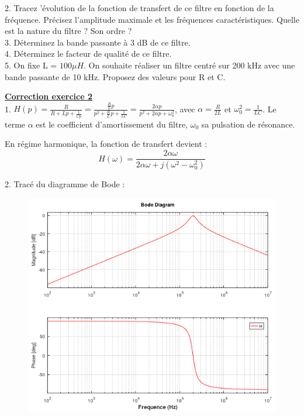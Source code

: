 \documentclass[11pt]{report}
\begin{document}
	2. Tracez 'évolution de la fonction de transfert de ce filtre en fonction de la fréquence. Précisez l'amplitude maximale et les fréquences caractéristiques. Quelle est la nature du filtre ? Son ordre ?\\
	
	3. Déterminez la bande passante à 3 dB de ce filtre. \\
	
	4. Déterminez le facteur de qualité de ce filtre. \\
	
	5. On fixe L = $100 \mu H$. On souhaite réaliser un filtre centré sur 200 kHz avec une bande passante de 10 kHz. Proposez des valeurs pour R et C.
	
	\vspace{1\baselineskip}
	
	\textbf{\underline{Correction exercice 2}}\\
	
	1. $H(p)=\frac{R}{R+Lp+\frac{1}{Cp}}=\frac{\frac{R}{L}p}{p^{2}+\frac{R}{L}p+\frac{1}{LC}} = \frac{2\alpha p}{p^{2}+2\alpha p+\omega_{0}^{2}}$, avec $\alpha=\frac{R}{2L}$ et $\omega_{0}^{2}=\frac{1}{LC}$. Le terme $\alpha$ est le coefficient d'amortissement du filtre, $\omega_{0}$ sa pulsation de résonance.
	
	En régime harmonique, la fonction de transfert devient :
	\begin{equation*}
	H(\omega)=\frac{2\alpha \omega}{2\alpha \omega+j(\omega^{2}-\omega_{0}^{2})}
	\end{equation*} 
	
	2. Tracé du diagramme de Bode :
	
	\begin{figure}[h!]
		\centering
		\includegraphics[scale=0.5]{images/Bode_circuit_bouchon.png} 
	\end{figure}
\end{document}
